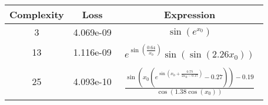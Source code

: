 \begin{center}
        \begin{tabular}{|c|c|c|}
        \hline
        Complexity & Loss & Expression \\
        \hline
        3 & 4.069e-09 & $\begin{aligned}\sin{\left(e^{x_{0}} \right)}\end{aligned}$\\ \hline13 & 1.116e-09 & $\begin{aligned}e^{\sin{\left(\frac{0.64}{x_{0}} \right)}} \sin{\left(\sin{\left(2.26 x_{0} \right)} \right)}\end{aligned}$\\ \hline25 & 4.093e-10 & $\begin{aligned}\frac{\sin{\left(x_{0} \left(e^{\sin{\left(x_{0} + \frac{0.75}{2 x_{0} - 0.17} \right)}} - 0.27\right) \right)} - 0.19}{\cos{\left(1.38 \cos{\left(x_{0} \right)} \right)}}\end{aligned}$\\ \hline\end{tabular}
        \end{center}
        